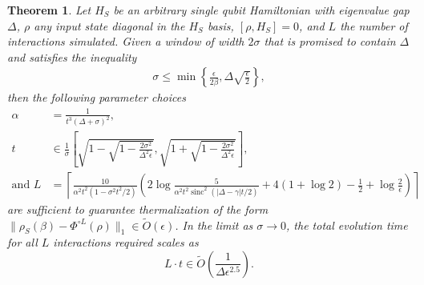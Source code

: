 \documentclass{article}
\newtheorem{theorem}{Theorem}
\newcommand{\norm}[1]{\| #1 \|}
\newcommand{\set}[1]{\left\{ #1 \right\}}
\newcommand{\bigotilde}[1]{\widetilde{O} \left( #1 \right)}
\DeclareMathOperator{\sinc}{sinc}
\begin{document}
\begin{theorem} \label{thm:single_qubit}
    Let $H_S$ be an arbitrary single qubit Hamiltonian with eigenvalue gap $\Delta$, $\rho$ any input state diagonal in the $H_S$ basis, $[\rho, H_S] = 0$, and $L$ the number of interactions simulated. Given a window of width $2 \sigma$ that is promised to contain $\Delta$ and satisfies the inequality
    \begin{align}
        \sigma \le \min \set{\frac{\epsilon}{2\beta}, \Delta \sqrt{\frac{\epsilon}{2}}},
    \end{align}
    then the following parameter choices 
    \begin{align}
        \alpha &= \frac{1}{t^3(\Delta + \sigma)^2}, \nonumber \\
        t &\in \frac{1}{\sigma}\left[\sqrt{1 - \sqrt{1 - \frac{2 \sigma^2}{\Delta^2 \epsilon}} }, \sqrt{1 + \sqrt{1 - \frac{2 \sigma^2}{\Delta^2 \epsilon}} } \right], \nonumber\\
        \text{and } L &= \left\lceil\frac{10}{\alpha^2 t^2 (1 - \sigma^2 t^2 / 2)} \left( 2 \log \frac{5}{\alpha^2 t^2 \sinc^2(|\Delta - \gamma|t/2)} + 4( 1 + \log 2) - \frac{1}{2} + \log \frac{2}{\epsilon} \right)\right\rceil
    \end{align}
    are sufficient to guarantee thermalization of the form $\norm{\rho_S(\beta) - \Phi^{\circ L}(\rho)}_1 \in \bigotilde{\epsilon}$. In the limit as $\sigma \to 0$, the total evolution time for all $L$ interactions required scales as
    \begin{equation}
        L \cdot t \in \widetilde{O} \left( \frac{1}{\Delta \epsilon^{2.5}}\right).
    \end{equation}
\end{theorem}
\end{document}
